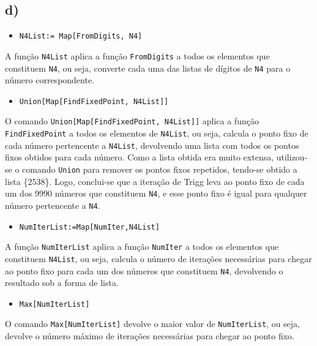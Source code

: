 \documentclass[12pt,a4paper]{article}
\begin{document}
    \subsection{d)}
        \begin{itemize}
            \item \texttt{N4List:= Map[FromDigits, N4]}
        \end{itemize}
        
        A função \texttt{N4List} aplica a função \texttt{FromDigits} a todos os elementos que constituem \texttt{N4}, ou seja, converte cada uma das listas de dígitos de \texttt{N4} para o número correspondente.

        \begin{itemize}
            \item \texttt{Union[Map[FindFixedPoint, N4List]]}
        \end{itemize}
        
        O comando \texttt{Union[Map[FindFixedPoint, N4List]]} aplica a função \texttt{FindFixedPoint} a todos os elementos de \texttt{N4List}, ou seja, calcula o ponto fixo de cada número pertencente a \texttt{N4List}, devolvendo uma lista com todos os pontos fixos obtidos para cada número. Como a lista obtida era muito extensa, utilizou-se o comando \texttt{Union} para remover os pontos fixos repetidos, tendo-se obtido a lista \{2538\}. Logo, conclui-se que a iteração de Trigg leva ao ponto fixo de cada um dos 9990 números que constituem \texttt{N4}, e esse ponto fixo é igual para qualquer número pertencente a \texttt{N4}.

        \begin{itemize}
            \item \texttt{NumIterList:=Map[NumIter,N4List]}
        \end{itemize}

        A função \texttt{NumIterList} aplica a função \texttt{NumIter} a todos os elementos que constituem \texttt{N4List}, ou seja, calcula o número de iterações necessárias para chegar ao ponto fixo para cada um dos números que constituem \texttt{N4}, devolvendo o resultado sob a forma de lista.

        \begin{itemize}
            \item \texttt{Max[NumIterList]}
        \end{itemize}

        O comando \texttt{Max[NumIterList]} devolve o maior valor de \texttt{NumIterList}, ou seja, devolve o número máximo de iterações necessárias para chegar ao ponto fixo.
\end{document}
